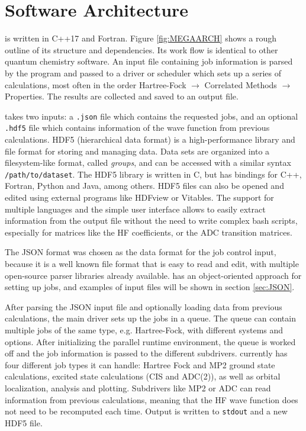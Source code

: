 \section{Software Architecture}

\mchem{} is written in C++17 and Fortran. Figure \ref{fig:MEGAARCH} shows a rough outline of its structure and dependencies. Its work flow is identical to other quantum chemistry software. An input file containing job information is parsed by the program and passed to  a driver or scheduler which sets up a series of calculations, most often in the order Hartree-Fock $\rightarrow$ Correlated Methods $\rightarrow$ Properties. The results are collected and saved to an output file.

\mchem{} takes two inputs: a \texttt{.json} file which contains the requested jobs, and an optional \texttt{.hdf5} file which contains information of the wave function from previous calculations. HDF5 (hierarchical data format) is a high-performance library and file format for storing and managing data. Data sets are organized into a filesystem-like format, called \emph{groups}, and can be accessed with a similar syntax \texttt{/path/to/dataset}. The  HDF5 library is written in C, but has bindings for C++, Fortran, Python and Java, among others. HDF5 files can also be opened and edited using external programs like HDFview or Vitables. The support for multiple languages and the simple user interface allows to easily extract information from the output file without the need to write complex bash scripts, especially for matrices like the HF coefficients, or the ADC transition matrices.  

The JSON format was chosen as the data format for the job control input, because it is a well known file format that is easy to read and edit, with multiple open-source parser libraries already available. \mchem{} has an object-oriented approach for setting up jobs, and examples of input files will be shown in section \ref{sec:JSON}.

After parsing the JSON input file and optionally loading data from previous calculations, the main driver sets up the jobs in a queue. The queue can contain multiple jobs of the same type, e.g. Hartree-Fock, with different systems and options. After initializing the parallel runtime environment, the queue is worked off and the job information is passed to the different subdrivers. \mchem{} currently has four different job types it can handle: Hartree Fock and MP2 ground state calculations, excited state calculations (CIS and ADC(2)), as well as orbital localization, analysis and plotting. Subdrivers like MP2 or ADC can read information from previous calculations, meaning that the HF wave function does not need to be recomputed each time. Output is written to \texttt{stdout} and a new HDF5 file. 

